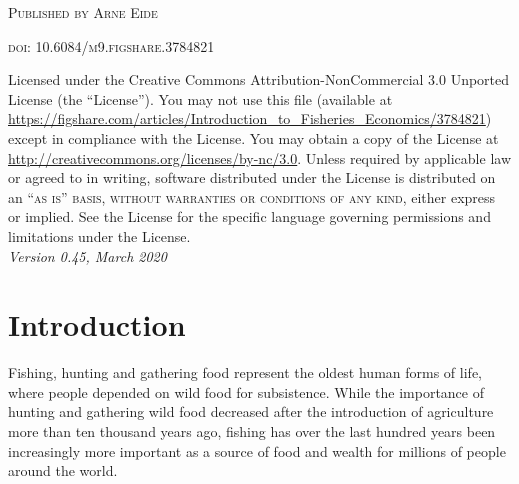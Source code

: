 \documentclass[11pt,fleqn]{book} %
\begin{document}
\noindent \textsc{Published by Arne Eide} %

\noindent \textsc{doi: 10.6084/m9.figshare.3784821} %

\noindent Licensed under the Creative Commons Attribution-NonCommercial 3.0 Unported License (the ``License''). You may not use this file (available at \url{https://figshare.com/articles/Introduction\_to\_Fisheries\_Economics/3784821}) except in compliance with the License. You may obtain a copy of the License at \url{http://creativecommons.org/licenses/by-nc/3.0}. Unless required by applicable law or agreed to in writing, software distributed under the License is distributed on an \textsc{``as is'' basis, without warranties or conditions of any kind}, either express or implied. See the License for the specific language governing permissions and limitations under the License.\\ %
\noindent \textit{Version 0.45, March 2020} %



\pagestyle{empty} %
\tableofcontents %
\cleardoublepage %
\pagestyle{fancy} %
\chapter{Introduction}\label{chapter 1}
Fishing, hunting and gathering food represent the oldest human forms of life, where people depended on wild food for subsistence. While the importance of hunting and gathering wild food decreased after the introduction of agriculture more than ten thousand years ago, fishing has over the last hundred years been increasingly more important as a source of food and wealth for millions of people around the world.
\end{document}
